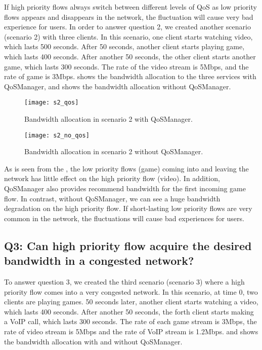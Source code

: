 If high priority flows always switch between different levels of QoS as low priority flows appears and disappears in the network, the fluctuation will cause very bad experience for users.
In order to answer question 2, we created another scenario (scenario 2) with three clients. In this scenario, one client starts watching video, which lasts 500 seconds. After 50 seconds,
another client starts playing game, which lasts 400 seconds. After another 50 seconds, the other client starts another game, which lasts 300 seconds. The rate of the video stream is 5Mbps, and
the rate of game is 3Mbps.  shows the bandwidth allocation to the three services with QoSManager, and  shows the bandwidth allocation without QoSManager.

\begin{figure}[htb]
\centering
\texttt{[image: s2\_qos]}
\caption{Bandwidth allocation in scenario 2 with QoSManager.}
\label{fig:s2_qos}
\end{figure}

\begin{figure}[htb]
\centering
\texttt{[image: s2\_no\_qos]}
\caption{Bandwidth allocation in scenario 2 without QoSManager.}
\label{fig:s2_no_qos}
\end{figure}

As is seen from the , the low priority flows (game) coming into and leaving the network has little effect on the high priority flow (video). In addition, QoSManager also
provides recommend bandwidth for the first incoming game flow. In contrast, without QoSManager, we can see a huge bandwidth degradation on the high priority flow. If short-lasting low priority
flows are very common in the network, the fluctuations will cause bad experiences for users.

\subsection{Q3: Can high priority flow acquire the desired bandwidth in a congested network?}

To answer question 3, we created the third scenario (scenario 3) where a high priority flow comes into a very congested network. In this scenario, at time 0, two clients are playing games.
50 seconds later, another client starts watching a video, which lasts 400 seconds. After another 50 seconds, the forth client starts making a VoIP call, which lasts 300 seconds. The rate of 
each game stream is 3Mbps, the rate of video stream is 5Mbps and the rate of VoIP stream is 1.2Mbps.  and  shows the bandwidth allocation with and without
QoSManager.

